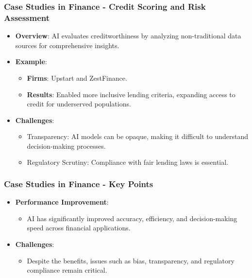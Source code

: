 \documentclass[aspectratio=169]{beamer}
\begin{document}
\begin{frame}[fragile]
    \frametitle{Case Studies in Finance - Credit Scoring and Risk Assessment}
    \begin{itemize}
        \item \textbf{Overview}: AI evaluates creditworthiness by analyzing non-traditional data sources for comprehensive insights.
        \item \textbf{Example}:
        \begin{itemize}
            \item \textbf{Firms}: Upstart and ZestFinance.
            \item \textbf{Results}: Enabled more inclusive lending criteria, expanding access to credit for underserved populations.
        \end{itemize}
        \item \textbf{Challenges}:
        \begin{itemize}
            \item Transparency: AI models can be opaque, making it difficult to understand decision-making processes.
            \item Regulatory Scrutiny: Compliance with fair lending laws is essential.
        \end{itemize}
    \end{itemize}
\end{frame}

\begin{frame}[fragile]
    \frametitle{Case Studies in Finance - Key Points}
    \begin{itemize}
        \item \textbf{Performance Improvement}:
        \begin{itemize}
            \item AI has significantly improved accuracy, efficiency, and decision-making speed across financial applications.
        \end{itemize}
        \item \textbf{Challenges}:
        \begin{itemize}
            \item Despite the benefits, issues such as bias, transparency, and regulatory compliance remain critical.
        \end{itemize}
    \end{itemize}
\end{frame}
\end{document}
